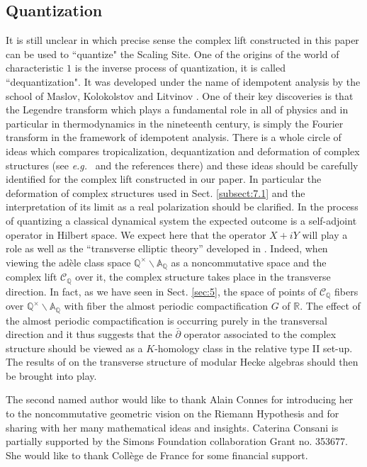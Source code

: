 \documentclass[graybox, envcountsect%
]{svmult}
\def\A{{\mathbb A}}
\def\Q{{\mathbb Q}}
\def\R{{\mathbb R}}
\def\cC{{\mathcal C}}
\def\caq{{\cC_\Q}}
\newcommand{\eg}{{\it e.g.\/}\ }
\begin{document}
\subsection{Quantization}\label{subsect:7.2}
 It is still unclear in which precise sense the complex lift constructed in this paper can be used to ``quantize" the Scaling Site. One of the origins of the world of characteristic $1$ is the inverse process of quantization, it is called ``dequantization".  It was developed under the name of idempotent analysis by the school of Maslov, Kolokolstov and Litvinov \cite{Maslov,Lit}. One of their key discoveries is that the Legendre transform which plays a fundamental role in all of physics and in particular in 
 thermodynamics in the nineteenth century, is simply the Fourier transform  in the framework of  idempotent analysis. There is a whole  circle of ideas which compares tropicalization, dequantization and deformation of complex structures (see \eg \cite{Baier} and the references there) and these ideas should be carefully identified for the complex lift constructed in our paper. In particular the deformation of complex structures used in Sect. \ref{subsect:7.1} and the interpretation of its limit as a real polarization should be clarified.  In the process of quantizing a classical dynamical system the expected outcome is a self-adjoint operator in Hilbert space.
We expect here that the operator $X+iY$ will play a role as well as the ``transverse elliptic theory'' developed in \cite{cmindex}. Indeed, when viewing the ad\`ele class space $\Q^\times\backslash \A_\Q$  as a noncommutative space and the complex lift $\caq$  over it, the complex structure takes place in the transverse direction. In fact, as we have seen in Sect.  \ref{sec:5}, the space of points of $\caq$ fibers over $\Q^\times\backslash \A_\Q$ with fiber the almost periodic compactification $G$ of $\R$. The effect of the almost periodic  compactification is occurring purely in the transversal direction and it thus suggests that the $\bar \partial$ operator associated to the complex structure should be viewed as a $K$-homology class in the relative type II set-up. The results of \cite{CoMo1,CoMo2,CoMo3} on the transverse structure of modular Hecke algebras should then be brought into play.

\begin{acknowledgement}
The second named author would like to thank Alain Connes for introducing her to the noncommutative geometric vision on the Riemann Hypothesis and for sharing with her many mathematical ideas and insights.\newline
Caterina Consani is partially supported by the Simons Foundation collaboration Grant no. 353677. She would like to thank Coll\`ege de France for some financial support.

\end{acknowledgement}
\end{document}
